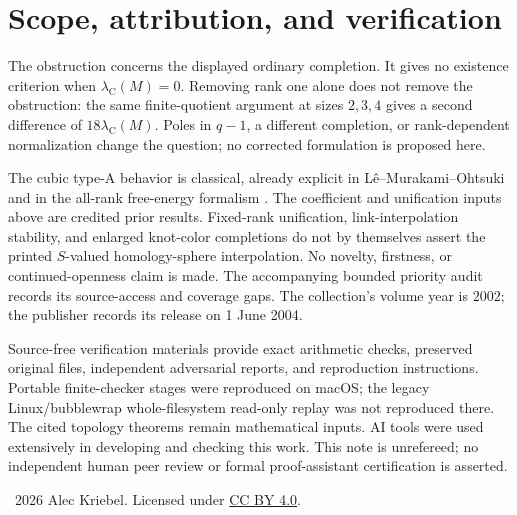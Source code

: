 \documentclass[11pt]{article}
\newcommand{\Cass}{\lambda_{\mathrm C}}
\begin{document}
\section{Scope, attribution, and verification}
The obstruction concerns the displayed ordinary completion.
It gives no existence criterion when $\Cass(M)=0$.
Removing rank one alone does not remove the obstruction:
the same finite-quotient argument at sizes $2,3,4$ gives a second
difference of $18\Cass(M)$.
Poles in $q-1$, a different completion, or rank-dependent normalization
change the question; no corrected formulation is proposed here.

The cubic type-A behavior is classical, already explicit in
L\^e--Murakami--Ohtsuki \cite[Proposition~5.3 and Remark~5.4]{LMO}
and in the all-rank free-energy formalism
\cite[\S3]{GLM}. The coefficient and unification inputs above are
credited prior results. Fixed-rank unification, link-interpolation
stability, and enlarged knot-color completions
\cite{BG,FZ,Fang} do not by themselves assert the printed
$S$-valued homology-sphere interpolation.
No novelty, firstness, or continued-openness claim is made.
The accompanying bounded priority audit records its source-access
and coverage gaps.
The collection's volume year is $2002$; the publisher records its
release on 1 June 2004.

Source-free verification materials provide exact arithmetic checks,
preserved original files, independent adversarial reports, and
reproduction instructions. Portable finite-checker stages were
reproduced on macOS; the legacy Linux/bubblewrap whole-filesystem
read-only replay was not reproduced there.
The cited topology theorems remain mathematical inputs.
AI tools were used extensively in developing and checking this work.
This note is unrefereed; no independent human peer review or formal
proof-assistant certification is asserted.

\smallskip
\noindent\textcopyright\ 2026 Alec Kriebel.
Licensed under \href{https://creativecommons.org/licenses/by/4.0/}{CC BY 4.0}.
\end{document}
